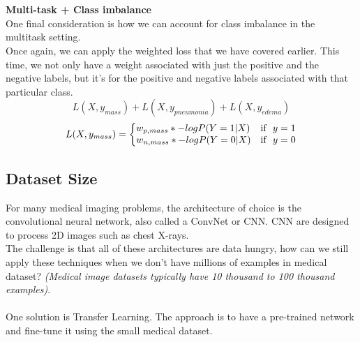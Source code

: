 \documentclass[a4paper,12pt]{article}
\begin{document}
\\\\
\textbf{Multi-task + Class imbalance}\\

One final consideration is how we can account for class imbalance in the multitask setting.\\
Once again, we can apply the weighted loss that we have covered earlier. This time, we not only have a weight associated with just the positive and the negative labels, but it's for the positive and negative labels associated with that particular class.\\
\[ L(X,y_{mass}) + L(X,y_{pneumonia}) + L(X,y_{edema}) \]
\begin{equation}
L(X,y_{mass})=\left\{
\begin{array}{@{}ll@{}}
w_{p,mass} * -log P(Y=1|X) & \text{if}\ \ y=1 \nonumber \\
w_{n,mass} * -log P(Y=0|X) & \text{if}\ \ y=0
\end{array}\right.
\end{equation}
\subsection{Dataset Size}
For many medical imaging problems, the architecture of choice is the convolutional neural network, also called a ConvNet or CNN. CNN are designed to process 2D images such as chest X-rays.\\
The challenge is that all of these architectures are data hungry, how can we still apply these techniques when we don't have millions of examples in medical dataset? \textit{(Medical image datasets typically have 10 thousand to 100 thousand examples)}.\\
\\
One solution is Transfer Learning. The approach is to have a pre-trained network and fine-tune it using the small medical dataset.
\end{document}
